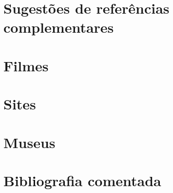 \documentclass[12pt]{extarticle}
\begin{document}
\section{Sugestões de referências complementares}

\section{Filmes}
\section{Sites}
\section{Museus}

\section{Bibliografia comentada}
\end{document}
